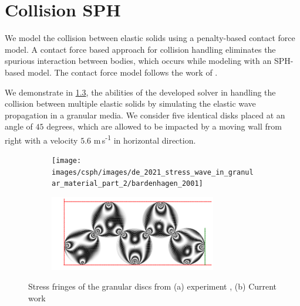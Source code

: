 \chapter{Collision SPH}
\label{chap:csph}

We model the collision between elastic solids using a penalty-based contact
force model. A contact force based approach for collision handling
eliminates the spurious interaction between bodies, which occurs while modeling
with an SPH-based model. The contact force model follows the work of
\textcite{mohseni2021particle}.

We demonstrate in \cref{fig:de-stress-wave-compare}, the abilities of the
developed solver in handling the collision between multiple elastic solids by
simulating the elastic wave propagation in a granular media. We consider five
identical disks placed at an angle of $45$ degrees, which are allowed to be
impacted by a moving wall from right with a velocity $5.6$
m\,s\textsuperscript{-1} in horizontal direction.
\begin{figure}[tpb]
  \centering
  \begin{subfigure}{0.8\textwidth}
    \centering
    \texttt{[image: images/csph/images/de\_2021\_stress\_wave\_in\_granular\_material\_part\_2/bardenhagen\_2001]}
    \subcaption{}\label{fig:de-stress-wave-bardenhagen}
  \end{subfigure}


  \begin{subfigure}{0.8\textwidth}
    \centering
    \includegraphics[width=0.8\textwidth]{figures/csph/figures/de_2021_stress_wave_in_granular_material_part_2/case_mohseni/time0}
    \subcaption{}\label{fig:de-stress-wave-current}
  \end{subfigure}
  \caption{Stress fringes of the granular discs from (a) experiment
    \citep{guilkey2001improved}, (b) Current work}
\label{fig:de-stress-wave-compare}
\end{figure}




